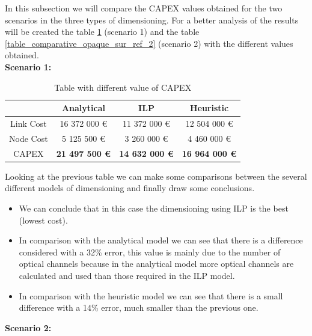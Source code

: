 \vspace{11pt}
In this subsection we will compare the CAPEX values obtained for the two scenarios in the three types of dimensioning. For a better analysis of the results will be created the table \ref{table_comparative_opaque_sur_ref_1} (scenario 1) and the table \ref{table_comparative_opaque_sur_ref_2} (scenario 2) with the different values obtained.\\

\textbf{Scenario 1:}\\

\begin{table}[h!]
\centering
\begin{tabular}{| c | c | c | c |}
 \hline
   & Analytical & ILP & Heuristic \\
 \hline\hline
 Link Cost & 16 372 000 \euro & 11 372 000 \euro & 12 504 000 \euro \\
 Node Cost & 5 125 500 \euro & 3 260 000 \euro & 4 460 000 \euro \\
 CAPEX & \textbf{21 497 500 \euro} & \textbf{14 632 000 \euro} & \textbf{16 964 000 \euro} \\
 \hline
\end{tabular}
\caption{Table with different value of CAPEX }
\label{table_comparative_opaque_sur_ref_1}
\end{table}

\vspace{11pt}
Looking at the previous table we can make some comparisons between the several different models of dimensioning and finally draw some conclusions.

\begin{itemize}
  \item We can conclude that in this case the dimensioning using ILP is the best (lowest cost).
  \item In comparison with the analytical model we can see that there is a difference considered with a 32\% error, this value is mainly due to the number of optical channels because in the analytical model more optical channels are calculated and used than those required in the ILP model.
  \item In comparison with the heuristic model we can see that there is a small difference with a 14\% error, much smaller than the previous one.
\end{itemize}

\vspace{11pt}
\textbf{Scenario 2:}\\

